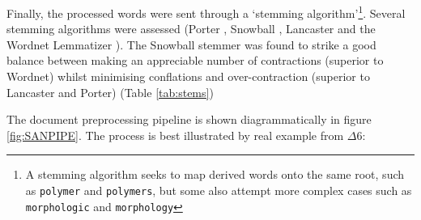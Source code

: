 Finally, the processed words were sent through a `stemming algorithm'\footnote{A stemming algorithm seeks to map derived words onto the same root, such as \texttt{polymer} and \texttt{polymers}, but some also attempt more complex cases such as \texttt{morphologic} and \texttt{morphology}}. Several stemming algorithms were assessed (Porter \cite{porter}, Snowball \cite{snowball}\cite{nltk}, Lancaster \cite{lancaster} and the Wordnet Lemmatizer \cite{wordnet1}\cite{wordnet2}\cite{wordnet3}). The Snowball stemmer was found to strike a good balance between making an appreciable number of contractions (superior to Wordnet) whilst minimising conflations and over-contraction (superior to Lancaster and Porter) (Table \ref{tab:stems})

The document preprocessing pipeline is shown diagrammatically in figure \ref{fig:SANPIPE}. The process is best illustrated by real example from $\Delta6$:

